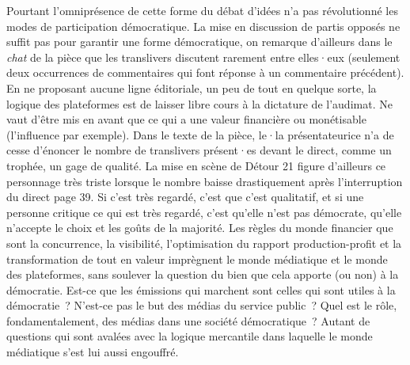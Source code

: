 \documentclass[
]{article}
\begin{document}
Pourtant l'omniprésence de cette forme du débat d'idées n'a pas révolutionné les modes de participation démocratique. La mise en discussion de partis opposés ne suffit pas pour garantir une forme démocratique, on remarque d'ailleurs dans le \emph{chat }de la pièce que les translivers discutent rarement entre elles·eux (seulement deux occurrences de commentaires qui font réponse à un commentaire précédent). En ne proposant aucune ligne éditoriale, un peu de tout en quelque sorte, la logique des plateformes est de laisser libre cours à la dictature de l'audimat. Ne vaut d'être mis en avant que ce qui a une valeur financière ou monétisable (l'influence par exemple). Dans le texte de la pièce, le·la présentateurice n'a de cesse d'énoncer le nombre de translivers présent·es devant le direct, comme un trophée, un gage de qualité. La mise en scène de Détour 21 figure d'ailleurs ce personnage très triste lorsque le nombre baisse drastiquement après l'interruption du direct page 39. Si c'est très regardé, c'est que c'est qualitatif, et si une personne critique ce qui est très regardé, c'est qu'elle n'est pas démocrate, qu'elle n'accepte le choix et les goûts de la majorité. Les règles du monde financier que sont la concurrence, la visibilité, l'optimisation du rapport production-profit et la transformation de tout en valeur imprègnent le monde médiatique et le monde des plateformes, sans soulever la question du bien que cela apporte (ou non) à la démocratie. Est-ce que les émissions qui marchent sont celles qui sont utiles à la démocratie~? N'est-ce pas le but des médias du service public~? Quel est le rôle, fondamentalement, des médias dans une société démocratique~? Autant de questions qui sont avalées avec la logique mercantile dans laquelle le monde médiatique s'est lui aussi engouffré.
\end{document}
